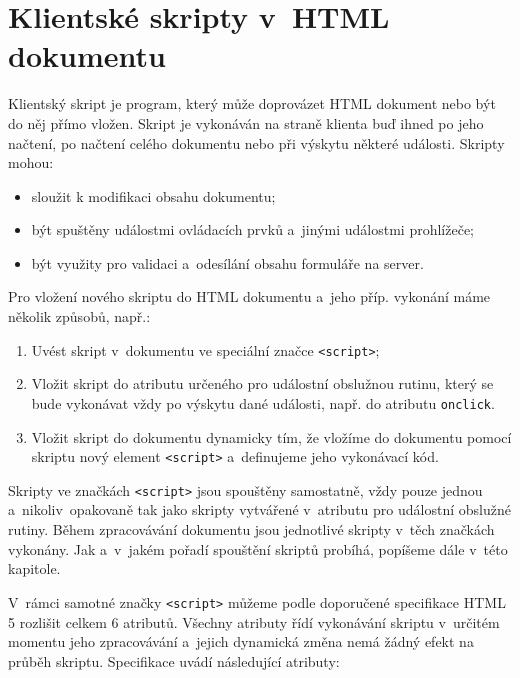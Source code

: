 \section{Klientské skripty v~HTML dokumentu}
\label{Chapter.DependenciesAnalysis.ScriptsInHTML}

Klientský skript je program, který může doprovázet HTML dokument nebo být do něj přímo vložen. Skript je vykonáván na straně klienta buď ihned po jeho načtení, po načtení celého dokumentu nebo při výskytu některé události. Skripty mohou:

\begin{itemize}
  \item sloužit k modifikaci obsahu dokumentu;
  \item být spuštěny událostmi ovládacích prvků a~jinými událostmi prohlížeče;
  \item být využity pro validaci a~odesílání obsahu formuláře na server.
\end{itemize}

\noindent Pro vložení nového skriptu do HTML dokumentu a~jeho příp. vykonání máme několik způsobů, např.:

\begin{enumerate}
  \item Uvést skript v~dokumentu ve speciální značce \texttt{<script>};
  \item Vložit skript do atributu určeného pro událostní obslužnou rutinu, který se bude vykonávat vždy po výskytu dané události, např. do atributu \texttt{onclick}.
  \item Vložit skript do dokumentu dynamicky tím, že vložíme do dokumentu pomocí skriptu nový element \texttt{<script>} a~definujeme jeho vykonávací kód.
\end{enumerate}

Skripty ve značkách \texttt{<script>} jsou spouštěny samostatně, vždy pouze jednou a~nikoliv~opakovaně tak jako skripty vytvářené v~atributu pro událostní obslužné rutiny. Během zpracovávání dokumentu jsou jednotlivé skripty v~těch značkách vykonány. Jak a~v~jakém pořadí spouštění skriptů probíhá, popíšeme dále v~této kapitole.

V~rámci samotné značky \texttt{<script>} můžeme podle doporučené specifikace HTML 5 rozlišit celkem 6 atributů. Všechny atributy řídí vykonávání skriptu v~určitém momentu jeho zpracovávání a~jejich dynamická změna nemá žádný efekt na průběh skriptu. Specifikace uvádí následující atributy:

